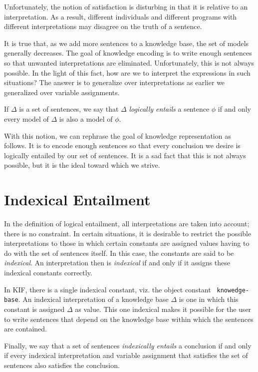 Unfortunately, the notion of satisfaction is disturbing in that it is relative
to an interpretation.  As a result, different individuals and different programs
with different interpretations may disagree on the truth of a sentence.

It is true that, as we add more sentences to a knowledge base, the set of
models generally decreases.  The goal of knowledge encoding is to write enough
sentences so that unwanted interpretations are eliminated.  Unfortunately, this
is not always possible.  In the light of this fact, how are we to interpret the
expressions in such situations?  The answer is to generalize over interpretations
as earlier we generalized over variable assignments.

If $\Delta$ is a set of sentences, we say that $\Delta$ {\it logically entails} a
sentence $\phi$ if and only every model of $\Delta$ is also a model of $\phi$.

With this notion, we can rephrase the goal of knowledge representation as
follows.  It is to encode enough sentences so that every conclusion we desire
is logically entailed by our set of sentences.  It is a sad fact
that this is not always possible, but it is the ideal toward which we strive.

\section{Indexical Entailment}

In the definition of logical entailment, all interpretations are taken into account;
there is no constraint.  In certain situations, it is desirable to restrict the
possible interpretations to those in which certain constants are assigned values
having to do with the set of sentences itself.  In this case, the constants are said
to be {\it indexical}.  An interpretation then is {\it indexical} if and only if it
assigns these indexical constants correctly.

In KIF, there is a single indexical constant, viz. the object constant {\tt
knowedge-base}.  An indexical interpretation of a knowledge base $\Delta$ is one in which this constant is assigned $\Delta$ as value.  This one indexical makes it possible for the user to write sentences that depend on the knowledge base within which the sentences are contained.

Finally, we say that a set of sentences {\it indexically entails} a conclusion if and
only if every indexical interpretation and variable assignment that satisfies the set
of sentences also satisfies the conclusion.

